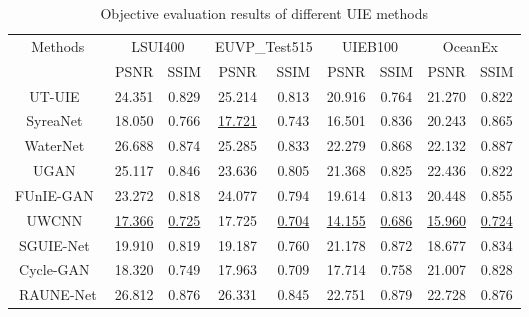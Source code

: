 \documentclass[runningheads]{llncs}
\begin{document}
\begin{table}
    \centering
    \caption{Objective evaluation results of different UIE methods}
    \label{tab2}
    \begin{tabular}{ccccccccc}
        \toprule
        \multirow{2}{*}{Methods} & \multicolumn{2}{c}{LSUI400} & \multicolumn{2}{c}{EUVP\_Test515} & \multicolumn{2}{c}{UIEB100} & \multicolumn{2}{c}{OceanEx} \\
        \cmidrule(lr){2-3} \cmidrule(lr){4-5} \cmidrule(lr){6-7} \cmidrule(lr){8-9}
        & PSNR & SSIM & PSNR & SSIM & PSNR & SSIM & PSNR & SSIM \\
        \midrule
        UT-UIE~\cite{peng2023ushape} & 24.351 & 0.829 & 25.214 & 0.813 & 20.916 & 0.764 & 21.270 & 0.822 \\
        SyreaNet~\cite{wen2023syreanet} & 18.050 & 0.766 & \underline{17.721} & 0.743 & 16.501 & 0.836 & 20.243 & 0.865 \\
        WaterNet~\cite{li2019underwater} & \color{blue}26.688 & \color{blue}0.874 & \color{blue}25.285 & \color{blue}0.833 & \color{blue}22.279 & \color{blue}0.868 & \color{blue}22.132 & \color{red}0.887 \\
        UGAN~\cite{fabbri2018enhancing} & 25.117 & 0.846 & 23.636 & 0.805 & 21.368 & 0.825 & 22.436 & 0.822 \\
        FUnIE-GAN~\cite{islam2020fast} & 23.272 & 0.818 & 24.077 & 0.794 & 19.614 & 0.813 & 20.448 & 0.855 \\
        UWCNN~\cite{li2020underwater} & \underline{17.366} & \underline{0.725} & 17.725 & \underline{0.704} & \underline{14.155} & \underline{0.686} & \underline{15.960} & \underline{0.724} \\
        SGUIE-Net~\cite{qi2022sguie} & 19.910 & 0.819 & 19.187 & 0.760 & 21.178 & 0.872 & 18.677 & 0.834 \\
        Cycle-GAN~\cite{li2018emerging} & 18.320 & 0.749 & 17.963 & 0.709 & 17.714 & 0.758 & 21.007 & 0.828 \\
        RAUNE-Net & \color{red}26.812 & \color{red}0.876 & \color{red}26.331 & \color{red}0.845 & \color{red}22.751 & \color{red}0.879 & \color{red}22.728 & \color{blue}0.876 \\
        \bottomrule
    \end{tabular}
\end{table}
\end{document}
